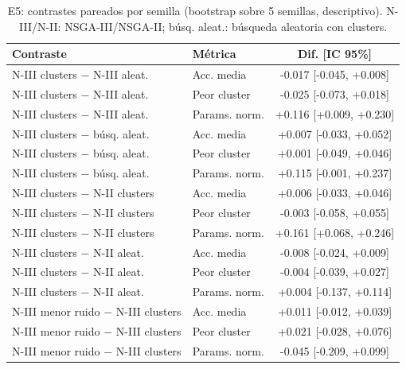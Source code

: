 \begin{table}[H]\centering\small\caption{E5: contrastes pareados por semilla (bootstrap sobre 5 semillas, descriptivo). N-III/N-II: NSGA-III/NSGA-II; búsq. aleat.: búsqueda aleatoria con clusters.}\label{tab:e5c}
\begin{tabular}{llc}
\toprule
Contraste & Métrica & Dif. [IC 95\%] \\
\midrule
N-III clusters $-$ N-III aleat. & Acc. media & -0.017 [-0.045, +0.008] \\
N-III clusters $-$ N-III aleat. & Peor cluster & -0.025 [-0.073, +0.018] \\
N-III clusters $-$ N-III aleat. & Params. norm. & +0.116 [+0.009, +0.230] \\
N-III clusters $-$ búsq. aleat. & Acc. media & +0.007 [-0.033, +0.052] \\
N-III clusters $-$ búsq. aleat. & Peor cluster & +0.001 [-0.049, +0.046] \\
N-III clusters $-$ búsq. aleat. & Params. norm. & +0.115 [-0.001, +0.237] \\
N-III clusters $-$ N-II clusters & Acc. media & +0.006 [-0.033, +0.046] \\
N-III clusters $-$ N-II clusters & Peor cluster & -0.003 [-0.058, +0.055] \\
N-III clusters $-$ N-II clusters & Params. norm. & +0.161 [+0.068, +0.246] \\
N-III clusters $-$ N-II aleat. & Acc. media & -0.008 [-0.024, +0.009] \\
N-III clusters $-$ N-II aleat. & Peor cluster & -0.004 [-0.039, +0.027] \\
N-III clusters $-$ N-II aleat. & Params. norm. & +0.004 [-0.137, +0.114] \\
N-III menor ruido $-$ N-III clusters & Acc. media & +0.011 [-0.012, +0.039] \\
N-III menor ruido $-$ N-III clusters & Peor cluster & +0.021 [-0.028, +0.076] \\
N-III menor ruido $-$ N-III clusters & Params. norm. & -0.045 [-0.209, +0.099] \\
\bottomrule
\end{tabular}
\end{table}

